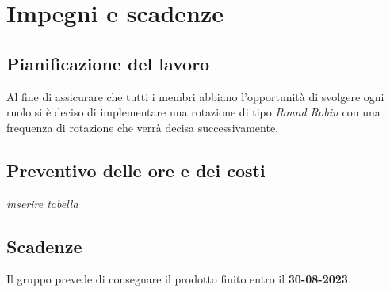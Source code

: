 \section{Impegni e scadenze}

\subsection{Pianificazione del lavoro}
Al fine di assicurare che tutti i membri abbiano l'opportunità di svolgere ogni ruolo si è deciso di implementare 
una rotazione di tipo  \textit{Round Robin} con una frequenza di rotazione che verrà decisa successivamente.

\subsection{Preventivo delle ore e dei costi}
\textit{inserire tabella}

\subsection{Scadenze}
Il gruppo prevede di consegnare il prodotto finito entro il \textbf{30-08-2023}. 
